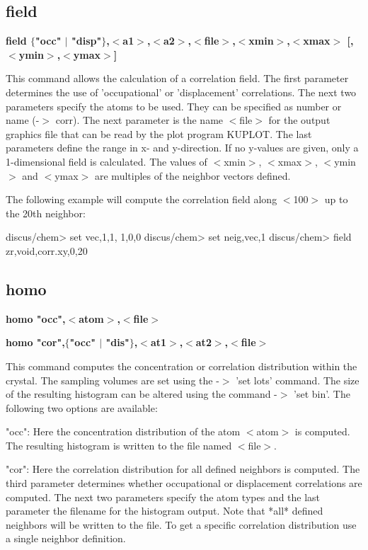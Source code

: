 \subsection*{field}
{\bf field $ \{$"occ" $| $ "disp"$\} $,$ <$a1$> $,$ <$a2$> $,$ <$file$> $,$ <$xmin$> $,$ <$xmax$> $ [,$ <$ymin$> $,$ <$ymax$> $] \par }
\par
\vspace{3pt}
This command allows the calculation of a correlation field. The 
first parameter determines the use of 'occupational' or 'displacement' 
correlations. The next two parameters specify the atoms to be used. 
They can be specified as number or name (-$> $ corr). The next 
parameter is the name $ <$file$> $ for the output graphics file that 
can be read by the plot program KUPLOT. The last parameters define 
the range in x- and y-direction. If no y-values are given, only 
a 1-dimensional field is calculated. The values of $ <$xmin$> $, $ <$xmax$> $, 
$ <$ymin$> $ and $ <$ymax$> $ are multiples of the neighbor vectors defined. 
\par
The following example will compute the correlation field along $ <$100$> $ 
up to the 20th neighbor: 
\par
\begin{MacVerbatim}
discus/chem> set vec,1,1, 1,0,0
discus/chem> set neig,vec,1
discus/chem> field zr,void,corr.xy,0,20
\end{MacVerbatim}
\subsection*{homo}
{\bf homo "occ",$ <$atom$> $,$ <$file$> $ \par }
{\bf homo "cor",$ \{$"occ" $| $ "dis"$\} $,$ <$at1$> $,$ <$at2$> $,$ <$file$> $ \par }
\par
\vspace{3pt}
This command computes the concentration or correlation distribution 
within the crystal. The sampling volumes are set using the -$> $ 'set 
lots' command. The size of the resulting histogram can be altered 
using the command -$> $ 'set bin'. The following two options are 
available: 
\par
"occ": Here the concentration distribution of the atom $ <$atom$> $ is 
computed. The resulting histogram is written to the file named 
$ <$file$> $. 
\par
"cor": Here the correlation distribution for all defined neighbors 
is computed. The third parameter determines whether occupational 
or displacement correlations are computed. The next two parameters 
specify the atom types and the last parameter the filename for 
the histogram output. Note that *all* defined neighbors will be 
written to the file. To get a specific correlation distribution 
use a single neighbor definition. 
